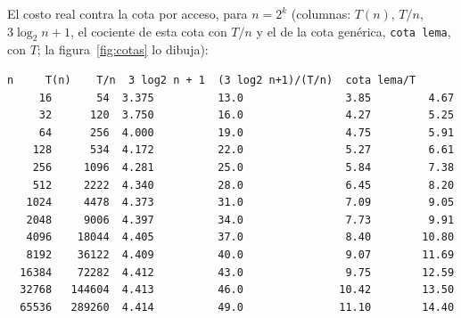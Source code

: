 \documentclass[11pt]{article}
\begin{document}
El costo real contra la cota por acceso, para $n=2^k$ (columnas: $T(n)$, $T/n$, $3\log_2n+1$, el cociente de esta cota con $T/n$ y el de la cota genérica, \texttt{cota lema}, con $T$; la figura~\ref{fig:cotas} lo dibuja):
\begin{lstlisting}[style=salida,basicstyle=\ttfamily\footnotesize\color{black},columns=fixed]
      n     T(n)    T/n  3 log2 n + 1  (3 log2 n+1)/(T/n)  cota lema/T
     16       54  3.375          13.0                3.85         4.67
     32      120  3.750          16.0                4.27         5.25
     64      256  4.000          19.0                4.75         5.91
    128      534  4.172          22.0                5.27         6.61
    256     1096  4.281          25.0                5.84         7.38
    512     2222  4.340          28.0                6.45         8.20
   1024     4478  4.373          31.0                7.09         9.05
   2048     9006  4.397          34.0                7.73         9.91
   4096    18044  4.405          37.0                8.40        10.80
   8192    36122  4.409          40.0                9.07        11.69
  16384    72282  4.412          43.0                9.75        12.59
  32768   144604  4.413          46.0               10.42        13.50
  65536   289260  4.414          49.0               11.10        14.40
\end{lstlisting}
\end{document}
